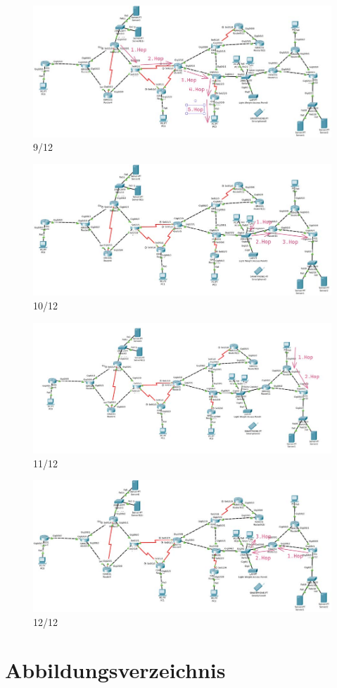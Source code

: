 \documentclass[a4paper]{article}
\begin{document}
\begin{figure}[h]
	\centering
	\includegraphics[scale=0.5]{9.jpg}
	\caption{9/12}
\end{figure}
\begin{figure}[h]
	\centering
	\includegraphics[scale=0.5]{10.jpg}
	\caption{10/12}
\end{figure}
\begin{figure}[h]
	\centering
	\includegraphics[scale=0.5]{11.jpg}
	\caption{11/12}
\end{figure}
\begin{figure}
	\centering
	\includegraphics[scale=0.5]{12.jpg}
	\caption{12/12}
\end{figure}

\newpage

\section{Abbildungsverzeichnis}

\listoffigures
\end{document}
